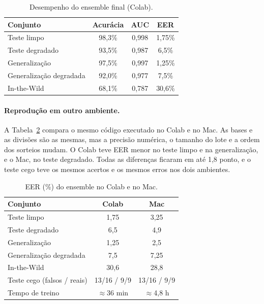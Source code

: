 \begin{table}[!ht]
\caption{Desempenho do ensemble final (Colab).}
\centering
\small
\begin{tabular}{@{}lccc@{}}
\hline\hline
Conjunto & Acurácia & AUC & EER \\
\hline
Teste limpo & 98,3\% & 0,998 & 1,75\% \\
Teste degradado & 93,5\% & 0,987 & 6,5\% \\
Generalização & 97,5\% & 0,997 & 1,25\% \\
Generalização degradada & 92,0\% & 0,977 & 7,5\% \\
In-the-Wild & 68,1\% & 0,787 & 30,6\% \\
\hline\hline
\end{tabular}
\label{tab:final}
\end{table}

\paragraph{Reprodução em outro ambiente.} A Tabela~\ref{tab:ambientes} compara o mesmo código executado no Colab e no Mac. As bases e as divisões são as mesmas, mas a precisão numérica, o tamanho do lote e a ordem dos sorteios mudam. O Colab teve EER menor no teste limpo e na generalização, e o Mac, no teste degradado. Todas as diferenças ficaram em até 1,8 ponto, e o teste cego teve os mesmos acertos e os mesmos erros nos dois ambientes.

\begin{table}[!ht]
\caption{EER (\%) do ensemble no Colab e no Mac.}
\centering
\small
\begin{tabular}{@{}lcc@{}}
\hline\hline
Conjunto & Colab & Mac \\
\hline
Teste limpo & 1,75 & 3,25 \\
Teste degradado & 6,5 & 4,9 \\
Generalização & 1,25 & 2,5 \\
Generalização degradada & 7,5 & 7,25 \\
In-the-Wild & 30,6 & 28,8 \\
Teste cego (falsos / reais) & 13/16 / 9/9 & 13/16 / 9/9 \\
Tempo de treino & $\approx$36 min & $\approx$4,8 h \\
\hline\hline
\end{tabular}
\label{tab:ambientes}
\end{table}

